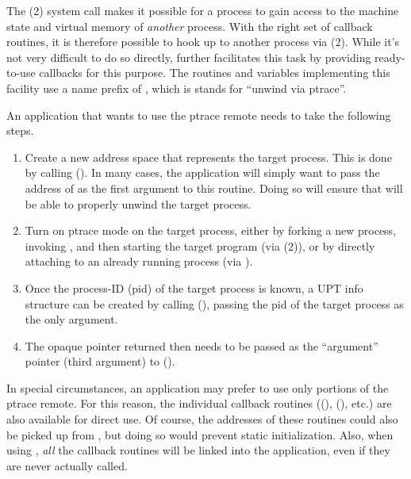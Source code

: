 \documentclass{article}
\begin{document}
The (2) system call makes it possible for a process to
gain access to the machine state and virtual memory of \emph{another}
process.  With the right set of callback routines, it is therefore
possible to hook up  to another process via
(2).  While it's not very difficult to do so directly,
 further facilitates this task by providing
ready-to-use callbacks for this purpose.  The routines and variables
implementing this facility use a name prefix of , which is
stands for ``unwind via ptrace''.

An application that wants to use the  ptrace remote needs to
take the following steps.
\begin{enumerate}

    \item Create a new  address space that represents the target
        process.  This is done by calling ().  In
        many cases, the application will simply want to pass the address of
         as the first argument to this routine.  Doing so
        will ensure that  will be able to properly unwind the
        target process.

    \item Turn on ptrace mode on the target process, either by forking a new
        process, invoking , and then starting the target
        program (via (2)), or by directly attaching to an already
        running process (via ).

    \item Once the process-ID (pid) of the target process is known, a
        UPT info structure can be created by calling
        (), passing the pid of the target process as the
        only argument.

    \item The opaque pointer returned then needs to be passed as the
        ``argument'' pointer (third argument) to ().

\end{enumerate}

In special circumstances, an application may prefer to use only
portions of the  ptrace remote.  For this reason, the individual
callback routines ((),
(), etc.)  are also available for direct use.  Of
course, the addresses of these routines could also be picked up from
, but doing so would prevent static initialization.  Also,
when using , \emph{all} the callback routines will be
linked into the application, even if they are never actually called.
\end{document}
